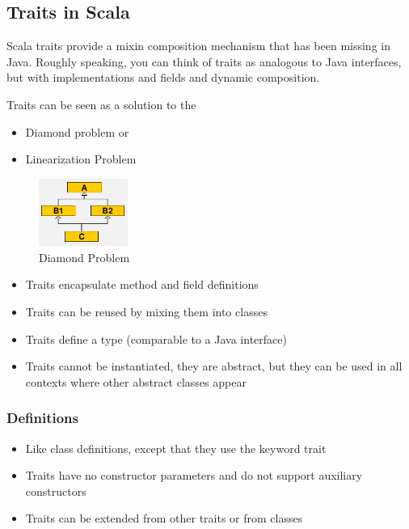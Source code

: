 \hypertarget{traits-in-scala}{%
\subsection{Traits in Scala}\label{traits-in-scala}}

Scala traits provide a mixin composition mechanism that has been missing
in Java. Roughly speaking, you can think of traits as analogous to Java
interfaces, but with implementations and fields and dynamic composition.

Traits can be seen as a solution to the

\begin{itemize}
\tightlist
\item
  Diamond problem or
\item
  Linearization Problem
\end{itemize}

\begin{figure}[H]
\centering
\includegraphics[width=110px]{figures/diamondProblem.png}
\caption{Diamond Problem}
\end{figure}

\begin{itemize}
\tightlist
\item
  Traits encapsulate method and field definitions
\item
  Traits can be reused by mixing them into classes
\item
  Traits define a type (comparable to a Java interface)
\item
  Traits cannot be instantiated, they are abstract, but they can be used
  in all contexts where other abstract classes appear
\end{itemize}

\hypertarget{definitions}{%
\subsubsection{Definitions}\label{definitions}}

\begin{itemize}
\tightlist
\item
  Like class definitions, except that they use the keyword trait
\item
  Traits have no constructor parameters and do not support auxiliary
  constructors
\item
  Traits can be extended from other traits or from classes
\end{itemize}

